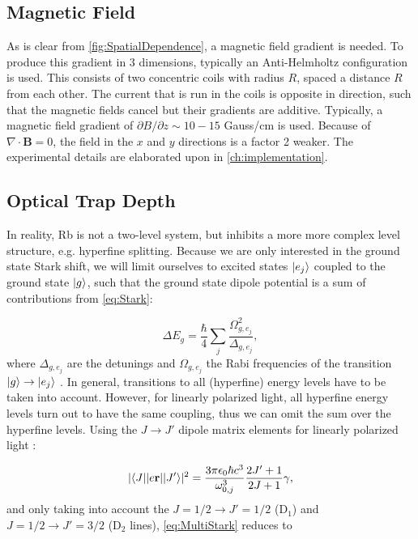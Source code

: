 \subsection{Magnetic Field}

As is clear from \cref{fig:SpatialDependence}, a magnetic field gradient is needed.
To produce this gradient in 3 dimensions, typically an Anti-Helmholtz configuration is used. 
This consists of two concentric coils with radius $R$, spaced a distance $R$ from each other. 
The current that is run in the coils is opposite in direction, such that the magnetic fields cancel but their gradients are additive.
Typically, a magnetic field gradient of $\partial B/\partial z \sim 10-15$ Gauss/cm is used.
Because of $\nabla \cdot \mathbf{B}=0$, the field in the $x$ and $y$ directions is a factor 2 weaker. The experimental details are elaborated upon in \cref{ch:implementation}.

\subsection{Optical Trap Depth}

In reality, Rb is not a two-level system, but inhibits a more more complex level structure, e.g. hyperfine splitting.
Because we are only interested in the ground state Stark shift, we will limit ourselves to excited states $\lvert e_j\rangle$ coupled to the ground state $\lvert g\rangle$, such that the ground state dipole potential is a sum of contributions from \cref{eq:Stark}:

\begin{equation}\label{eq:MultiStark}
    \Delta E_{g} = \frac{\hbar}{4} \sum_j \frac{\Omega_{g,e_j}^2}{\Delta_{g,e_j}},
\end{equation}
where $\Delta_{g,e_j}$ are the detunings and $\Omega_{g,e_j}$ the Rabi frequencies of the transition $\lvert g\rangle \rightarrow \lvert e_j\rangle$ \cite{Brossard2020}. 
In general, transitions to all (hyperfine) energy levels have to be taken into account. 
However, for linearly polarized light, all hyperfine energy levels turn out to have the same coupling, thus we can omit the sum over the hyperfine levels. Using the $J \rightarrow J'$ dipole matrix elements for linearly polarized light \cite{Steck2008}:

\begin{equation}
    |\langle J\rvert | e \mathbf{r} | \lvert J'\rangle|^2 = \frac{3 \pi \epsilon_0 \hbar c^3}{\omega_{0,j}^3} \frac{2J'+1}{2J+1} \gamma,
\end{equation}
and only taking into account the $J=1/2 \rightarrow J'=1/2$ (D$_1$) and $J=1/2 \rightarrow J'=3/2$ (D$_2$ lines), \cref{eq:MultiStark} reduces to

